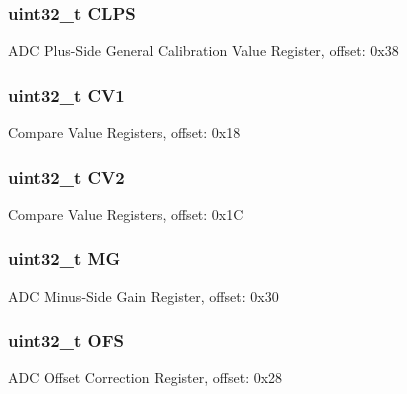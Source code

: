 \subsubsection[{C\+L\+P\+S}]{\setlength{\rightskip}{0pt plus 5cm}uint32\+\_\+t C\+L\+P\+S}\label{struct_a_d_c___mem_map_ab05c59171a0798d67bac0442294ace5c}
A\+D\+C Plus-\/\+Side General Calibration Value Register, offset\+: 0x38 \hypertarget{struct_a_d_c___mem_map_a4951f828bd61ae3b9357b256b68cc980}{}
\subsubsection[{C\+V1}]{\setlength{\rightskip}{0pt plus 5cm}uint32\+\_\+t C\+V1}\label{struct_a_d_c___mem_map_a4951f828bd61ae3b9357b256b68cc980}
Compare Value Registers, offset\+: 0x18 \hypertarget{struct_a_d_c___mem_map_afd9792b1696c6e49b9e5185e1e3fc256}{}
\subsubsection[{C\+V2}]{\setlength{\rightskip}{0pt plus 5cm}uint32\+\_\+t C\+V2}\label{struct_a_d_c___mem_map_afd9792b1696c6e49b9e5185e1e3fc256}
Compare Value Registers, offset\+: 0x1\+C \hypertarget{struct_a_d_c___mem_map_ac87ddc65facdf3933d71e874b9275745}{}
\subsubsection[{M\+G}]{\setlength{\rightskip}{0pt plus 5cm}uint32\+\_\+t M\+G}\label{struct_a_d_c___mem_map_ac87ddc65facdf3933d71e874b9275745}
A\+D\+C Minus-\/\+Side Gain Register, offset\+: 0x30 \hypertarget{struct_a_d_c___mem_map_a917f361e89fd45e7bf2e7733fda76f86}{}
\subsubsection[{O\+F\+S}]{\setlength{\rightskip}{0pt plus 5cm}uint32\+\_\+t O\+F\+S}\label{struct_a_d_c___mem_map_a917f361e89fd45e7bf2e7733fda76f86}
A\+D\+C Offset Correction Register, offset\+: 0x28 \hypertarget{struct_a_d_c___mem_map_aced9d6037d771813e327ae3924bc4f6a}{}
